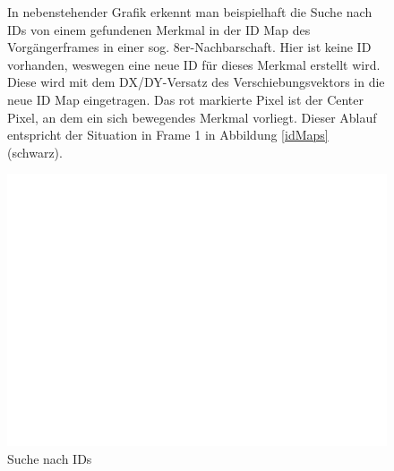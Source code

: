 \begin{figure}[H]
  \begin{minipage}{0.6\textwidth}
  In nebenstehender Grafik erkennt man beispielhaft die Suche nach IDs von einem gefundenen Merkmal in der ID Map des Vorgängerframes in einer sog. 8er-Nachbarschaft. Hier ist keine ID vorhanden, weswegen eine neue ID für dieses Merkmal erstellt wird. Diese wird mit dem DX/DY-Versatz des Verschiebungsvektors in die neue ID Map eingetragen. Das rot markierte Pixel ist der Center Pixel, an dem ein sich bewegendes Merkmal vorliegt. Dieser Ablauf entspricht der Situation in Frame 1 in Abbildung \ref{idMaps} (schwarz).
  \end{minipage}
\hfill
  \begin{minipage}{0.2\textwidth}
    \includegraphics[width=\textwidth]{images/dummy.png}
    \caption{Suche nach IDs}
    \label{searchRadius}
  \end{minipage}
\end{figure}
